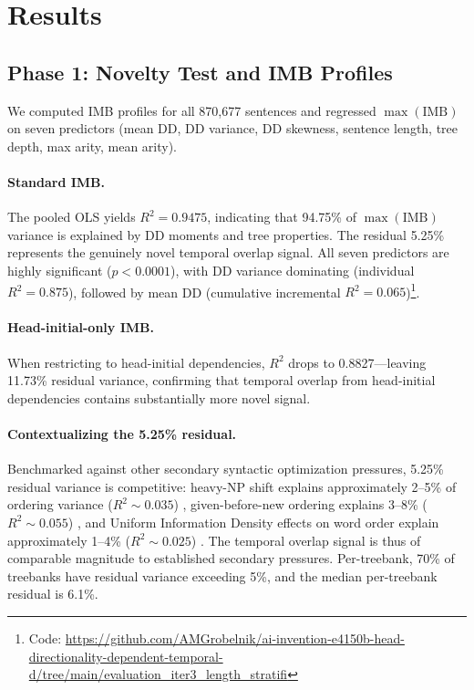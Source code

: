 \documentclass[11pt,letterpaper]{article}
\begin{document}
\section{Results}
\label{sec:results}

\subsection{Phase 1: Novelty Test and IMB Profiles}

We computed IMB profiles for all 870,677 sentences and regressed $\max(\text{IMB})$ on seven predictors (mean DD, DD variance, DD skewness, sentence length, tree depth, max arity, mean arity).

\paragraph{Standard IMB.} The pooled OLS yields $R^2 = 0.9475$, indicating that 94.75\% of $\max(\text{IMB})$ variance is explained by DD moments and tree properties. The residual 5.25\% represents the genuinely novel temporal overlap signal. All seven predictors are highly significant ($p < 0.0001$), with DD variance dominating (individual $R^2 = 0.875$), followed by mean DD (cumulative incremental $R^2 = 0.065$)\footnote{Code: \url{https://github.com/AMGrobelnik/ai-invention-e4150b-head-directionality-dependent-temporal-d/tree/main/evaluation_iter3_length_stratifi}}.

\paragraph{Head-initial-only IMB.} When restricting to head-initial dependencies, $R^2$ drops to 0.8827---leaving 11.73\% residual variance, confirming that temporal overlap from head-initial dependencies contains substantially more novel signal.

\paragraph{Contextualizing the 5.25\% residual.} Benchmarked against other secondary syntactic optimization pressures, 5.25\% residual variance is competitive: heavy-NP shift explains approximately 2--5\% of ordering variance ($R^2 \sim 0.035$) \citep{Wasow2002}, given-before-new ordering explains 3--8\% ($R^2 \sim 0.055$) \citep{Bresnan2007}, and Uniform Information Density effects on word order explain approximately 1--4\% ($R^2 \sim 0.025$) \citep{Clark2023}. The temporal overlap signal is thus of comparable magnitude to established secondary pressures. Per-treebank, 70\% of treebanks have residual variance exceeding 5\%, and the median per-treebank residual is 6.1\%.
\end{document}
